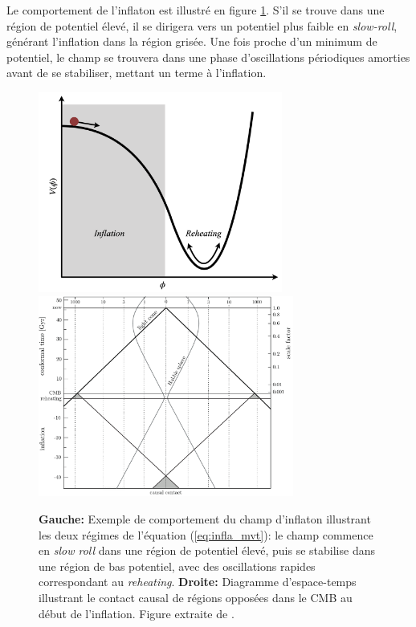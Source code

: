 Le comportement de l'inflaton est illustré en figure \ref{fig:inflation}.
S'il se trouve dans une région de potentiel élevé, il se dirigera vers un potentiel plus faible en \textit{slow-roll}, générant l'inflation dans la région grisée.
Une fois proche d'un minimum de potentiel, le champ se trouvera dans une phase d'oscillations périodiques amorties avant de se stabiliser, mettant un terme à l'inflation.

\begin{figure}[t]
    \centering
    \includegraphics[height=6.6cm]{Figures/Chap_cosmo/SlowRoll2.png}\hfill
    \includegraphics[height=6.6cm]{Figures/Chap_cosmo/spacetime_inflation.pdf}
    \caption{
        \textbf{Gauche:} Exemple de comportement du champ d'inflaton illustrant les deux régimes de l'équation (\ref{eq:infla_mvt}): le champ commence en \textit{slow roll} dans une région de potentiel élevé, puis se stabilise dans une région de bas potentiel, avec des oscillations rapides correspondant au \textit{reheating}.
        \textbf{Droite:} Diagramme d'espace-temps illustrant le contact causal de régions opposées dans le CMB au début de l'inflation.
        Figure extraite de \cite{baumann_inflation_2015}.
    }
    \label{fig:inflation}
\end{figure}

